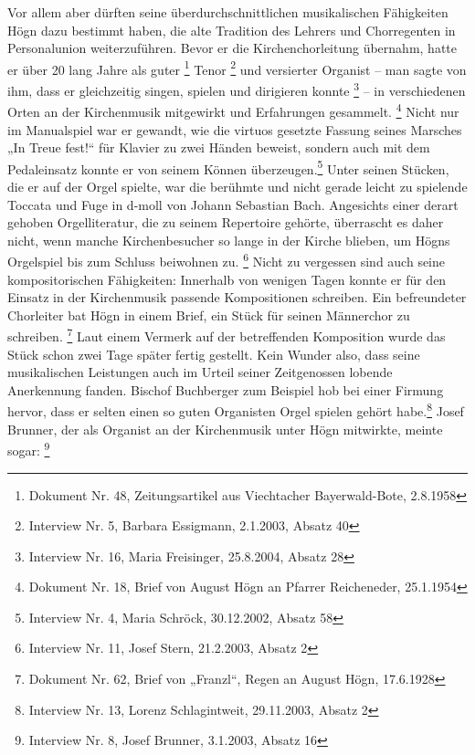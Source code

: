 Vor allem aber dürften seine überdurchschnittlichen musikalischen
Fähigkeiten Högn dazu bestimmt haben, die alte Tradition des Lehrers
und Chorregenten in Personalunion weiterzuführen. Bevor er die
Kirchenchorleitung übernahm, hatte er über 20 lang Jahre als
guter \footnote{Dokument Nr. 48, Zeitungsartikel aus Viechtacher
Bayerwald-Bote, 2.8.1958} Tenor \footnote{Interview Nr. 5, Barbara
Essigmann, 2.1.2003, Absatz 40} und versierter Organist – man sagte von
ihm, dass er gleichzeitig singen, spielen und dirigieren
konnte \footnote{Interview Nr. 16, Maria Freisinger, 25.8.2004, Absatz
28} – in verschiedenen Orten an der Kirchenmusik mitgewirkt und
Erfahrungen gesammelt. \footnote{Dokument Nr. 18, Brief von August Högn
an Pfarrer Reicheneder, 25.1.1954} Nicht nur im Manualspiel war er
gewandt, wie die virtuos gesetzte Fassung seines Marsches „In Treue
fest!“ für Klavier zu zwei Händen beweist, sondern auch mit dem
Pedaleinsatz konnte er von seinem Können überzeugen.\footnote{
Interview Nr. 4, Maria Schröck, 30.12.2002, Absatz 58} Unter seinen
Stücken, die er auf der Orgel spielte, war die berühmte und nicht
gerade leicht zu spielende Toccata und Fuge in d-moll von Johann
Sebastian Bach. Angesichts einer derart gehoben Orgelliteratur, die zu
seinem Repertoire gehörte, überrascht es daher nicht, wenn manche
Kirchenbesucher so lange in der Kirche blieben, um Högns Orgelspiel bis
zum Schluss beiwohnen zu. \footnote{Interview Nr. 11, Josef Stern,
21.2.2003, Absatz 2} Nicht zu vergessen sind auch seine
kompositorischen Fähigkeiten: Innerhalb von wenigen Tagen konnte er für
den Einsatz in der Kirchenmusik passende Kompositionen schreiben. Ein
befreundeter Chorleiter bat Högn in einem Brief, ein Stück für seinen
Männerchor zu schreiben. \footnote{Dokument Nr. 62, Brief von „Franzl“,
Regen an August Högn, 17.6.1928} Laut einem Vermerk auf der
betreffenden Komposition wurde das Stück schon zwei Tage später fertig
gestellt. Kein Wunder also, dass seine musikalischen Leistungen auch im
Urteil seiner Zeitgenossen lobende Anerkennung fanden. Bischof
Buchberger zum Beispiel hob bei einer Firmung hervor, dass er selten
einen so guten Organisten Orgel spielen gehört habe.\footnote{
Interview Nr. 13, Lorenz Schlagintweit, 29.11.2003, Absatz 2} Josef
Brunner, der als Organist an der Kirchenmusik unter Högn mitwirkte,
meinte sogar:  \footnote{Interview Nr. 8, Josef
Brunner, 3.1.2003, Absatz 16}

